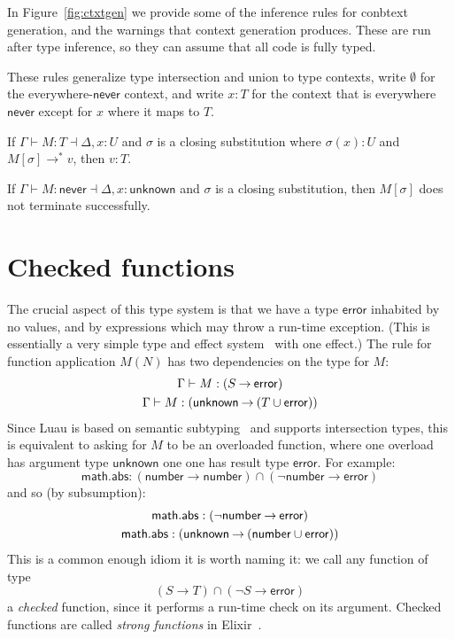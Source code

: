 \documentclass[sigplan]{acmart}
\newcommand{\NEVER}{\mathsf{never}}
\newcommand{\ERROR}{\mathsf{error}}
\newcommand{\UNKNOWN}{\mathsf{unknown}}
\newcommand{\NUMBER}{\mathsf{number}}
\newcommand{\MATH}{\mathsf{math}}
\newcommand{\ABS}{\mathsf{abs}}
\newcommand{\fun}{\mathbin{\rightarrow}}
\begin{document}
In Figure~\ref{fig:ctxtgen} we provide some of the inference rules for
conbtext generation, and the warnings that context generation produces.
These are run after type inference, so they can assume that all code is fully typed.

These rules generalize type intersection and union to type contexts,
write $\emptyset$ for the everywhere-$\NEVER$ context, and write $x:T$
for the context that is everywhere $\NEVER$ except for $x$ where it
maps to $T$.

\begin{conjecture}\label{conj:complete}%
If $\Gamma \vdash M : T \dashv \Delta, x:U$ and $\sigma$ is a closing
substitution where $\sigma(x) : U$ and $M[\sigma] \rightarrow^* v$,
then $v : T$.
\end{conjecture}

\begin{corollary}
If $\Gamma \vdash M : \NEVER \dashv \Delta, x:\UNKNOWN$ and $\sigma$ is a closing
substitution, then $M[\sigma]$ does not terminate successfully.
\end{corollary}

\section{Checked functions}

The crucial aspect of this type system is that we have a type $\ERROR$
inhabited by no values, and by expressions which may throw a run-time exception.
(This is essentially a very simple type and effect system~\cite{Nielson1999}
with one effect.)
The rule for function application $M(N)$
has two dependencies on the type for $M$:
\[\begin{array}{c}
  \Gamma \vdash M : (S \fun \ERROR)
  \\[\jot]
  \Gamma \vdash M : (\UNKNOWN \fun (T \cup \ERROR))
\end{array}\]
Since Luau is based on semantic subtyping~\cite{GF05:GentleIntroduction,Jef22:SemanticSubtyping} and supports
intersection types, this is equivalent to asking for $M$ to be an
overloaded function, where one overload has argument type $\UNKNOWN$ one
one has result type $\ERROR$. For example:
\[
  \MATH.\ABS : (\NUMBER \fun \NUMBER) \cap (\neg\NUMBER \fun \ERROR)
\]
and so (by subsumption):
\[\begin{array}{c}
  \MATH.\ABS : (\neg\NUMBER \fun \ERROR)
  \\[\jot]
  \MATH.\ABS : (\UNKNOWN \fun (\NUMBER \cup \ERROR))
\end{array}\]
This is a common enough idiom it is worth naming it:
we call any function of type 
\[
  (S \fun T) \cap (\neg S \fun \ERROR)
\]
a \emph{checked} function, since it performs a run-time check
on its argument. Checked functions are called \emph{strong functions}
in Elixir~\cite{DesignElixir}.
\end{document}

